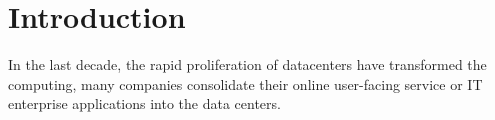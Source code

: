 \section{Introduction}
\label{sec:intro}

In the last decade, the rapid proliferation of datacenters have transformed the computing, many companies consolidate their online user-facing service or IT enterprise applications into the data centers. 